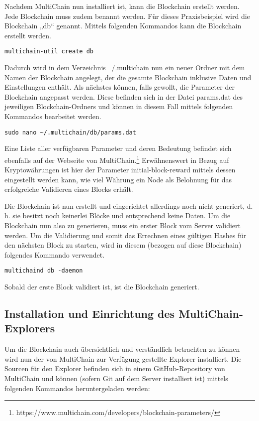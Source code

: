 Nachdem MultiChain nun installiert ist, kann die Blockchain erstellt werden. Jede Blockchain muss zudem benannt werden. Für dieses Praxisbeispiel wird die Blockchain „db“ genannt. Mittels folgenden Kommandos kann die Blockchain erstellt werden.

\begin{lstlisting}[frame=single]
multichain-util create db
\end{lstlisting}

Dadurch wird in dem Verzeichnis ~/.multichain nun ein neuer Ordner mit dem Namen der Blockchain angelegt, der die gesamte Blockchain inklusive Daten und Einstellungen enthält. Als nächstes können, falls gewollt, die Parameter der Blockchain angepasst werden. Diese befinden sich in der Datei params.dat des jeweiligen Blockchain-Ordners und können in diesem Fall mittels folgenden Kommandos bearbeitet werden.

\begin{lstlisting}[frame=single]
sudo nano ~/.multichain/db/params.dat
\end{lstlisting}

Eine Liste aller verfügbaren Parameter und deren Bedeutung befindet sich ebenfalls auf der Webseite von MultiChain.\footnote{https://www.multichain.com/developers/blockchain-parameters/} Erwähnenswert in Bezug auf Kryptowährungen ist hier der Parameter initial-block-reward mittels dessen eingestellt werden kann, wie viel Währung ein Node als Belohnung für das erfolgreiche Validieren eines Blocks erhält.

Die Blockchain ist nun erstellt und eingerichtet allerdings noch nicht generiert, d. h. sie besitzt noch keinerlei Blöcke und entsprechend keine Daten. Um die Blockchain nun also zu generieren, muss ein erster Block vom Server validiert werden. Um die Validierung und somit das Errechnen eines gültigen Hashes für den nächsten Block zu starten, wird in diesem (bezogen auf diese Blockchain) folgendes Kommando verwendet.

\begin{lstlisting}[frame=single]
	multichaind db -daemon
\end{lstlisting}

Sobald der erste Block validiert ist, ist die Blockchain generiert.

\subsection{Installation und Einrichtung des MultiChain-Explorers}
\label{subsec:trans-erstellung}
Um die Blockchain auch übersichtlich und verständlich betrachten zu können wird nun der von MultiChain zur Verfügung gestellte Explorer installiert. Die Sourcen für den Explorer befinden sich in einem GitHub-Repository von MultiChain und können (sofern Git auf dem Server installiert ist) mittels folgenden Kommandos heruntergeladen werden:

